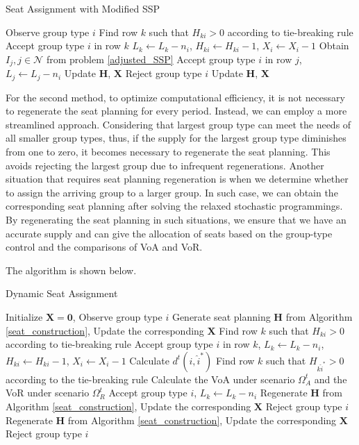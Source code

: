 \begin{algorithm}[H]
  \caption{Seat Assignment with Modified SSP}
  {Observe group type $i$\;
    {Find row $k$ such that $H_{ki} >0$ according to tie-breaking rule\; 
    Accept group type $i$ in row $k$\; 
    $L_{k} \gets L_{k} -n_{i}$, $H_{ki} \gets H_{ki} -1$, $X_{i} \gets X_{i} -1$\;}
    {{Obtain $I_{j}, j \in \mathcal{N}$ from problem \eqref{adjusted_SSP}\;
    {Accept group type $i$ in row $j$, $L_{j} \gets L_{j} - n_{i}$\; 
    Update $\bm{H}$, $\bm{X}$\;}
    {Reject group type $i$\; 
    Update $\bm{H}$, $\bm{X}$\;}}
    }}
\end{algorithm}


For the second method, to optimize computational efficiency, it is not necessary to regenerate the seat planning for every period. Instead, we can employ a more streamlined approach. Considering that largest group type can meet the needs of all smaller group types, thus, if the supply for the largest group type diminishes from one to zero, it becomes necessary to regenerate the seat planning. This avoids rejecting the largest group due to infrequent regenerations. Another situation that requires seat planning regeneration is when we determine whether to assign the arriving group to a larger group. In such case, we can obtain the corresponding seat planning after solving the relaxed stochastic programmings. By regenerating the seat planning in such situations, we ensure that we have an accurate supply and can give the allocation of seats based on the group-type control and the comparisons of VoA and VoR.

The algorithm is shown below.

\begin{algorithm}[H]
  \caption{Dynamic Seat Assignment}
  {Initialize $\bm{X} = \bm{0}$, Observe group type $i$\;
   {Generate seat planning $\bm{H}$ from Algorithm \ref{seat_construction}, Update the corresponding $\bm{X}$}
    {Find row $k$ such that $H_{ki} >0$ according to tie-breaking rule\; 
    Accept group type $i$ in row $k$, $L_{k} \gets L_{k} -n_{i}$, $H_{ki} \gets H_{ki} -1$, $X_{i} \gets X_{i} -1$}
    {Calculate $d^{t}(i, \hat{i}^{*})$\;
    {Find row $k$ such that $H_{k \hat{i}^{*}} > 0$ according to the tie-breaking rule\; 
    Calculate the VoA under scenario $\Omega^{t}_{A}$ and the VoR under scenario $\Omega^{t}_{R}$\;
    {Accept group type $i$, $L_{k} \gets L_{k} - n_{i}$\; 
    Regenerate $\bm{H}$ from Algorithm \ref{seat_construction}, Update the corresponding $\bm{X}$\;}
    {Reject group type $i$\; 
    Regenerate $\bm{H}$ from Algorithm \ref{seat_construction}, Update the corresponding $\bm{X}$\;}}
    {Reject group type $i$\;}
    }}
\end{algorithm}

 